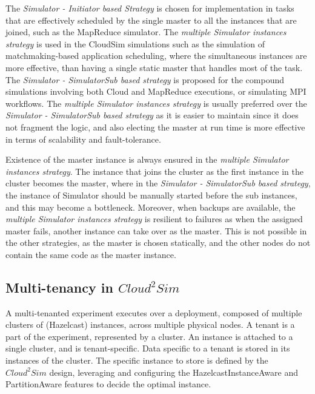 The \textit{Simulator - Initiator based Strategy} is chosen for implementation in tasks that are effectively scheduled by the single master to all the instances that are joined, such as the MapReduce simulator. The \textit{multiple Simulator instances strategy} is used in the CloudSim simulations such as the simulation of matchmaking-based application scheduling, where the simultaneous instances are more effective, than having a single static master that handles most of the task. The \textit{Simulator - SimulatorSub based strategy} is proposed for the compound simulations involving both Cloud and MapReduce executions, or simulating MPI workflows. The \textit{multiple Simulator instances strategy} is usually preferred over the \textit{Simulator - SimulatorSub based strategy} as it is easier to maintain since it does not fragment the logic, and also electing the master at run time is more effective in terms of scalability and fault-tolerance.

Existence of the master instance is always ensured in the \textit{multiple Simulator instances strategy}. The instance that joins the cluster as the first instance in the cluster becomes the master, where in the \textit{Simulator - SimulatorSub based strategy}, the instance of Simulator should be manually started before the sub instances, and this may become a bottleneck. Moreover, when backups are available, the \textit{multiple Simulator instances strategy} is resilient to failures as when the assigned master fails, another instance can take over as the master. This is not possible in the other strategies, as the master is chosen statically, and the other nodes do not contain the same code as the master instance.

\subsection{Multi-tenancy in $Cloud^{2}Sim$}
A multi-tenanted experiment executes over a deployment, composed of multiple clusters of (Hazelcast) instances, across multiple physical nodes. A tenant is a part of the experiment, represented by a cluster. An instance is attached to a single cluster, and is tenant-specific. Data specific to a tenant is stored in its instances of the cluster. The specific instance to store is defined by the $Cloud^{2}Sim$ design, leveraging and configuring the HazelcastInstanceAware and PartitionAware features to decide the optimal instance.

